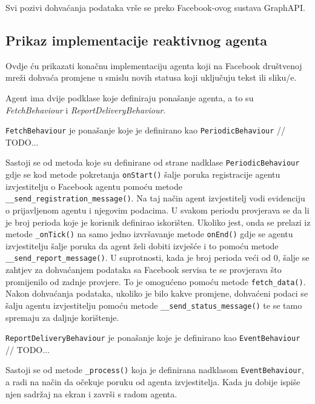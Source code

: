 \documentclass[a4paper,12pt]{foi}
\begin{document}
Svi pozivi dohvaćanja podataka vrše se preko Facebook-ovog sustava GraphAPI.

\subsection{Prikaz implementacije reaktivnog agenta}

Ovdje ću prikazati konačnu implementaciju agenta koji na Facebook društvenoj mreži dohvaća promjene u smislu novih statusa koji uključuju tekst ili sliku/e.

\lstset{commentstyle=\textit,language=python}


Agent ima dvije podklase koje definiraju ponašanje agenta, a to su \textit{FetchBehaviour} i \textit{ReportDeliveryBehaviour}.

\texttt{FetchBehaviour} je ponašanje koje je definirano kao \texttt{PeriodicBehaviour} // TODO... 

Sastoji se od metoda koje su definirane od strane nadklase \texttt{PeriodicBehaviour} gdje se kod metode pokretanja \texttt{onStart()} šalje poruka registracije agentu izvjestitelju o Facebook agentu pomoću metode \texttt{\_\_send\_registration\_message()}. Na taj način agent izvjestitelj vodi evidenciju o prijavljenom agentu i njegovim podacima. U svakom periodu provjerava se da li je broj perioda koje je korisnik definirao iskorišten. Ukoliko jest, onda se prelazi iz metode \texttt{\_onTick()} na samo jedno izvršavanje metode \texttt{onEnd()} gdje se agentu izvjestitelju šalje poruka da agent želi dobiti izvješće i to pomoću metode \texttt{\_\_send\_report\_message()}. U suprotnosti, kada je broj perioda veći od 0, šalje se zahtjev za dohvaćanjem podataka sa Facebook servisa te se provjerava što promijenilo od zadnje provjere. To je omogućeno pomoću metode \texttt{fetch\_data()}. Nakon dohvaćanja podataka, ukoliko je bilo kakve promjene, dohvaćeni podaci se šalju agentu izvjestitelju pomoću metode \texttt{\_\_send\_status\_message()} te se tamo spremaju za daljnje korištenje.

\texttt{ReportDeliveryBehaviour} je ponašanje koje je definirano kao \texttt{EventBehaviour} // TODO... 

Sastoji se od metode \texttt{\_process()} koja je definirana nadklasom \texttt{EventBehaviour}, a radi na način da očekuje poruku od agenta izvjestitelja. Kada ju dobije ispiše njen sadržaj na ekran i završi s radom agenta.
\end{document}
